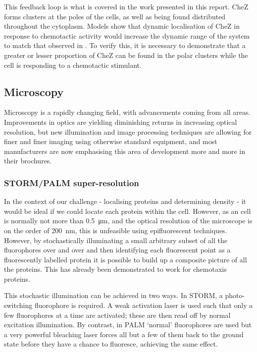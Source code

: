 \documentclass[../main.tex]{subfiles}
\begin{document}
This feedback loop is what is covered in the work presented in this report. CheZ forms clusters at the poles of the cells, as well as being found distributed throughout the cytoplasm. Models show that dynamic localisation of CheZ in response to chemotactic activity would increase the dynamic range of the system to match that observed in \ecoli\cite{lipkow06}. To verify this, it is necessary to demonstrate that a greater or lesser proportion of CheZ can be found in the polar clusters while the cell is responding to a chemotactic stimulant.

\subsection{Microscopy}

Microscopy is a rapidly changing field, with advancements coming from all areas. Improvements in optics are yielding diminishing returns in increasing optical resolution, but new illumination and image processing techniques are allowing for finer and finer imaging using otherwise standard equipment, and most manufacturers are now emphasising this area of development more and more in their brochures.

\subsubsection{STORM/PALM super-resolution}
In the context of our challenge - localising proteins and determining density - it would be ideal if we could locate each protein within the \ecoli cell. However, as an \ecoli cell is normally not more than \SI{0.5}{\micro\meter}, and the optical resolution of the microscope is on the order of \SI{200}{\nano\meter}, this is unfeasible using epifluorescent techniques. However, by stochastically illuminating a small arbitrary subset of all the fluorophores over and over and then identifying each fluorescent point as a fluorescently labelled protein it is possible to build up a composite picture of all the proteins. This has already been demonstrated to work for \ecoli chemotaxis proteins.

This stochastic illumination can be achieved in two ways. In STORM, a photo-switching fluorophore is required. A weak activation laser is used such that only a few fluorophores at a time are activated; these are then read off by normal excitation illumination. By contrast, in PALM `normal' fluorophores are used but a very powerful bleaching laser forces all but a few of them back to the ground state before they have a chance to fluoresce, achieving the same effect.
\end{document}
